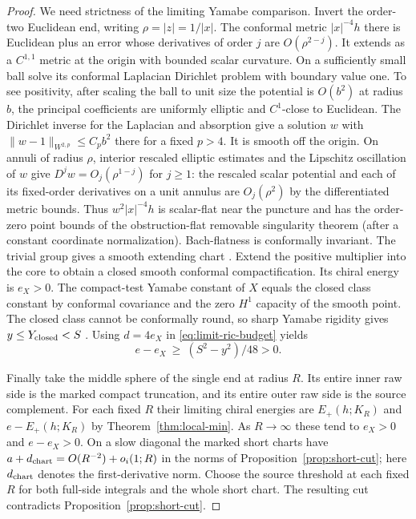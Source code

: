 \begin{proof}
We need strictness of the limiting Yamabe comparison. Invert the
order-two Euclidean end, writing \(\rho=|z|=1/|x|\). The conformal
metric \(|x|^{-4}h\) there is Euclidean plus an error whose derivatives
of order \(j\) are \(O(\rho^{2-j})\). It extends as a \(C^{1,1}\)
metric at the origin with bounded scalar curvature. On a sufficiently
small ball solve its conformal Laplacian Dirichlet problem with
boundary value one. To see positivity, after scaling the ball to
unit size the potential is \(O(b^2)\) at radius \(b\), the principal
coefficients are uniformly elliptic and \(C^1\)-close to Euclidean.
The Dirichlet inverse for the Laplacian and absorption give a solution
\(w\) with \(\|w-1\|_{W^{2,p}}\le C_p b^2\) there for a fixed
\(p>4\). It is smooth off the origin. On annuli of radius \(\rho\),
interior rescaled elliptic estimates and the Lipschitz oscillation
of \(w\) give \(D^jw=O_j(\rho^{1-j})\) for \(j\ge1\): the rescaled scalar potential and each of its fixed-order derivatives on a unit annulus are \(O_j(\rho^2)\) by the differentiated metric bounds.
Thus \(w^2|x|^{-4}h\) is scalar-flat near the puncture and has
the order-zero point bounds of the obstruction-flat removable
singularity theorem (after a constant coordinate normalization).
Bach-flatness is conformally invariant. The trivial group gives
a smooth extending chart \cite[Definition 1.6, Theorem 1.8 and
Remark 7.2]{AcheViaclovsky2011Obstruction}. Extend the positive
multiplier into the core to obtain a closed smooth conformal
compactification. Its chiral energy is \(e_X>0\). The compact-test
Yamabe constant of \(X\) equals the closed class constant by conformal
covariance and the zero \(H^1\) capacity of the smooth point.
The closed class cannot be conformally round, so sharp Yamabe
rigidity gives \(y\le Y_{\rm closed}<S\) \cite[Theorem 2]{Schoen1984Yamabe}.
Using \(d=4e_X\) in \eqref{eq:limit-ric-budget} yields
\begin{equation}\label{eq:physical-residual}
 e-e_X\ \ge\ (S^2-y^2)/48>0 .
\end{equation}

Finally take the middle sphere of the single end at radius \(R\).
Its entire inner raw side is the marked compact truncation, and
its entire outer raw side is the source complement. For each fixed
\(R\) their limiting chiral energies are \(E_+(h;K_R)\) and
\(e-E_+(h;K_R)\) by Theorem~\ref{thm:local-min}. As \(R\to\infty\)
these tend to \(e_X>0\) and \(e-e_X>0\).
On a slow diagonal the marked short charts have
\(a+d_{\rm chart}=O(R^{-2})+o_i(1;R)\) in the norms of
Proposition~\ref{prop:short-cut}; here \(d_{\rm chart}\) denotes
the first-derivative norm. Choose the source threshold at each fixed
\(R\) for both full-side integrals and the whole short chart.
The resulting cut contradicts Proposition~\ref{prop:short-cut}.
\end{proof}

